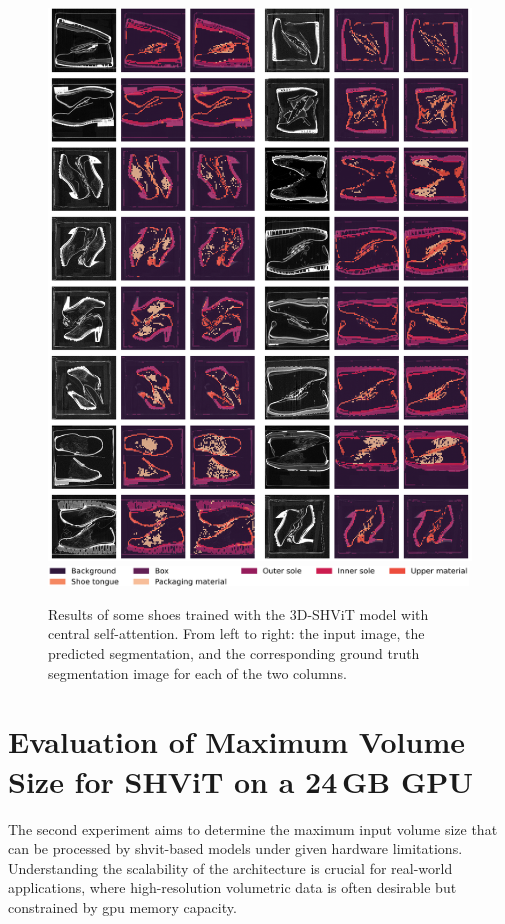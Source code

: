 \begin{figure}[H]
	\centering
	\includegraphics[width=1.0\textwidth]{./images/Shoes_224x224x224_B5S2_v3.png}
	\includegraphics[width=0.9925\textwidth]{./images/color_legend_7_classes.png}
	\caption[Results of some shoes trained with the 3D-SHViT model with central self-attention]{Results of some shoes trained with the 3D-SHViT model with central self-attention. From left to right: the input image, the predicted segmentation, and the corresponding ground truth segmentation image for each of the two columns.}
	\label{result_for_shvit_with_center_attention}
\end{figure}



\section{Evaluation of Maximum Volume Size for SHViT on a 24\,GB GPU}
The second experiment aims to determine the maximum input volume size that can be processed by \gls{shvit}-based models under given hardware limitations. Understanding the scalability of the architecture is crucial for real-world applications, where high-resolution volumetric data is often desirable but constrained by \acrshort{gpu} memory capacity.

